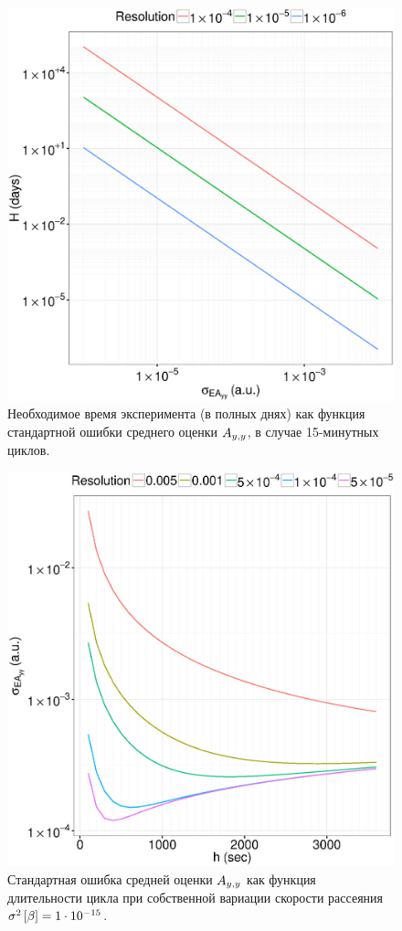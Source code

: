 \documentclass{article}
\begin{document}
	\begin{figure}[h]
		\centering
		\includegraphics[scale=.8]{img/BeamTime_15minCycles.eps}
		\caption{Необходимое время эксперимента (в полных днях) как функция стандартной ошибки среднего оценки $\Ayy$, в случае 15-минутных циклов.\label{fig:BeamTime}}
	\end{figure}
	\begin{figure}[h]
		\centering
		\includegraphics[scale=.8]{img/SEAyy_varB_15min.eps}
		\caption{Стандартная ошибка средней оценки $\Ayy$ как функция длительности цикла при собственной вариации скорости рассеяния $\v{\slp} = 1\cdot10^{-15}$.\label{fig:SEAyy_varb}}
	\end{figure}
	
\end{document}
